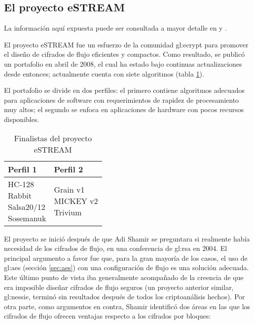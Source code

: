 %
%

\subsection{El proyecto eSTREAM}

La información aquí expuesta puede ser consultada a mayor detalle en
\cite{resultados_estream_1, resultados_estream_2} y \cite{estream_portafolio}.

El proyecto eSTREAM fue un esfuerzo de la comunidad \gls{gl:ecrypt} para
promover el diseño de cifrados de flujo eficientes y compactos. Como resultado,
se publicó un portafolio en abril de 2008, el cual ha estado bajo continuas
actualizaciones desde entonces; actualmente cuenta con siete algoritmos
(tabla \ref{portafolio_estream}).

El portafolio se divide en dos perfiles: el primero contiene algoritmos
adecuados para aplicaciones de software con requerimientos de rapidez de
procesamiento muy altos; el segundo se enfoca en aplicaciones de hardware con
pocos recursos disponibles.

\begin{table}
  \centering
  \begin{tabular}{| m{0.85in} | m{0.85in} |}
    \hline
    \textbf{Perfil 1} & \textbf{Perfil 2} \\ [0.5ex]
    \hline
    \makecell{HC-128 \\ Rabbit \\ Salsa20/12 \\ Sosemanuk} &
    \makecell{Grain v1 \\ MICKEY v2 \\ Trivium} \\
    \hline
  \end{tabular}
  \caption{Finalistas del proyecto eSTREAM}
  \label{portafolio_estream}
\end{table}

El proyecto se inició después de que Adi Shamir se preguntara si realmente
había necesidad de los cifrados de flujo, en una conferencia de
\gls{gl:rsa} en 2004. El principal argumento a favor fue que, para la gran
mayoría de los casos, el uso de \gls{gl:aes} (sección \ref{sec:aes}) con
una configuración de flujo es una solución adecuada. Este último punto de vista
iba generalmente acompañado de la creencia de que era imposible diseñar cifrados
de flujo seguros (un proyecto anterior similar, \gls{gl:nessie}, terminó
sin resultados después de todos los criptoanálisis hechos). Por otra parte,
como argumentos en contra, Shamir identificó dos áreas en las que los cifrados
de flujo ofrecen ventajas respecto a los cifrados por bloques:

